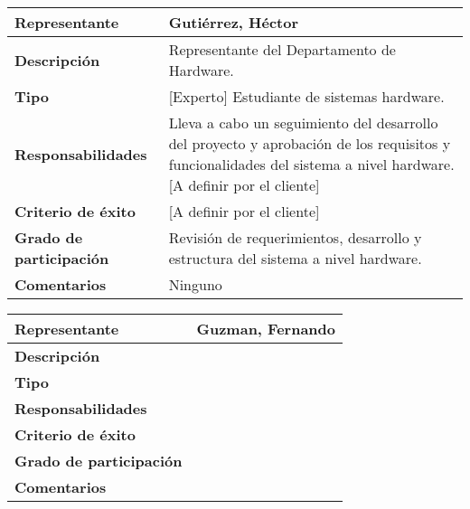         \begin{tabular}{|p{4cm}|p{12cm}|}
            \hline \textbf{Representante} &  Gutiérrez, Héctor\\
            \hline \textbf{Descripción} &  Representante del Departamento de Hardware. \\
            \hline \textbf{Tipo} &  [Experto] Estudiante de sistemas hardware.\\
            \hline \textbf{Responsabilidades} &  Lleva a cabo un seguimiento del desarrollo del proyecto y aprobación de  los requisitos y funcionalidades del sistema a nivel hardware. [A definir por el cliente]\\
            \hline \textbf{Criterio de éxito} &  [A definir por el cliente]\\
            \hline \textbf{Grado de participación} &  Revisión de requerimientos, desarrollo y estructura del sistema a nivel hardware.\\
            \hline \textbf{Comentarios} &  Ninguno\\
            \hline
        \end{tabular}

        \begin{tabular}{|p{4cm}|p{12cm}|}
            \hline \textbf{Representante} & Guzman, Fernando \\
            \hline \textbf{Descripción} &  \\
            \hline \textbf{Tipo} &  \\
            \hline \textbf{Responsabilidades} &  \\
            \hline \textbf{Criterio de éxito} &  \\
            \hline \textbf{Grado de participación} &  \\
            \hline \textbf{Comentarios} &  \\
            \hline
        \end{tabular}

